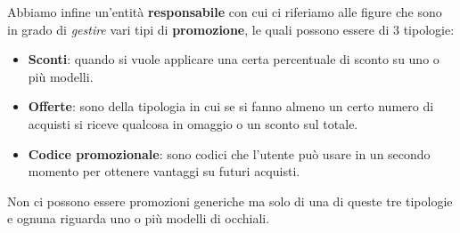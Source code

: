 Abbiamo infine un'entità \textbf{responsabile} con cui ci riferiamo alle figure che sono in
grado di \emph{gestire} vari tipi di \textbf{promozione}, le quali possono essere di 3 tipologie:
\begin{itemize}
	\item \textbf{Sconti}: quando si vuole applicare una certa percentuale di sconto su uno o più
	      modelli.
	\item \textbf{Offerte}: sono della tipologia in cui se si fanno almeno un certo numero di
	      acquisti si riceve qualcosa in omaggio o un sconto sul totale.
	\item \textbf{Codice promozionale}: sono codici che l'utente può usare in un secondo momento
	      per ottenere vantaggi su futuri acquisti.
\end{itemize}
Non ci possono essere promozioni generiche ma solo di una di queste tre tipologie e ognuna riguarda
uno o più modelli di occhiali.